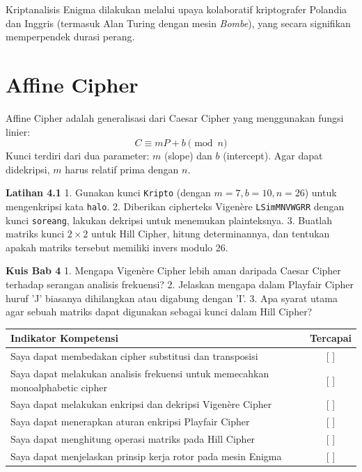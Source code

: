 \documentclass[../main.tex]{subfiles}
\begin{document}
Kriptanalisis Enigma dilakukan melalui upaya kolaboratif kriptografer Polandia dan Inggris (termasuk Alan Turing dengan mesin \textit{Bombe}), yang secara signifikan memperpendek durasi perang.

\section{Affine Cipher}
Affine Cipher adalah generalisasi dari Caesar Cipher yang menggunakan fungsi linier:
\[ C \equiv mP + b \pmod{n} \]
Kunci terdiri dari dua parameter: $m$ (slope) dan $b$ (intercept). Agar dapat didekripsi, $m$ harus relatif prima dengan $n$.

\begin{obereflection}
\textbf{Latihan 4.1}
1. Gunakan kunci \texttt{Kripto} (dengan $m=7, b=10, n=26$) untuk mengenkripsi kata \texttt{halo}.
2. Diberikan cipherteks Vigen\`ere \texttt{LSimMNVWGRR} dengan kunci \texttt{soreang}, lakukan dekripsi untuk menemukan plainteksnya.
3. Buatlah matriks kunci $2 \times 2$ untuk Hill Cipher, hitung determinannya, dan tentukan apakah matriks tersebut memiliki invers modulo 26.
\end{obereflection}

\begin{obeassessment}
\textbf{Kuis Bab 4}
1. Mengapa Vigen\`ere Cipher lebih aman daripada Caesar Cipher terhadap serangan analisis frekuensi?
2. Jelaskan mengapa dalam Playfair Cipher huruf 'J' biasanya dihilangkan atau digabung dengan 'I'.
3. Apa syarat utama agar sebuah matriks dapat digunakan sebagai kunci dalam Hill Cipher?
\end{obeassessment}

\begin{competencychecklist}
\begin{tabularx}{\linewidth}{|X|c|}
\hline
Indikator Kompetensi & Tercapai \\
\hline
Saya dapat membedakan cipher substitusi dan transposisi & [ ] \\
\hline
Saya dapat melakukan analisis frekuensi untuk memecahkan monoalphabetic cipher & [ ] \\
\hline
Saya dapat melakukan enkripsi dan dekripsi Vigen\`ere Cipher & [ ] \\
\hline
Saya dapat menerapkan aturan enkripsi Playfair Cipher & [ ] \\
\hline
Saya dapat menghitung operasi matriks pada Hill Cipher & [ ] \\
\hline
Saya dapat menjelaskan prinsip kerja rotor pada mesin Enigma & [ ] \\
\hline
\end{tabularx}
\end{competencychecklist}
\end{document}
